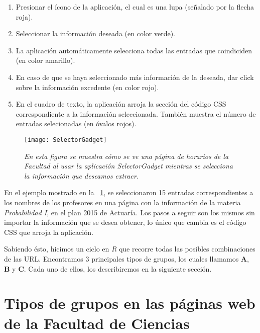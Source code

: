 \begin{enumerate}
\item Presionar el ícono de la aplicación, el cual es una lupa (señalado por la flecha roja).

\item Seleccionar la información deseada (en color verde).

\item La aplicación automáticamente selecciona todas las entradas que coindiciden (en color amarillo).

\item En caso de que se haya seleccionado más información de la deseada, dar click sobre la información excedente (en color rojo).

\item  En el cuadro de texto, la aplicación arroja la sección del código CSS correspondiente a la información seleccionada. También muestra el número de entradas selecionadas (en óvalos rojos).
\end{enumerate}


\begin{figure}[H]
\centering
\texttt{[image: SelectorGadget]} %
\caption[\textit{Uso de la aplicación SelectorGadget}]{\textit{En esta figura se muestra cómo se ve una página de horarios de la Facultad al usar la aplicación SelectorGadget mientras se selecciona la información que deseamos extraer.}}\label{appSelectorGadget}
\end{figure}

En el ejemplo mostrado en la \figurename{~\ref{appSelectorGadget}}, se seleccionaron 15 entradas correspondientes a los nombres de los profesores en una página con la información de la materia \textit{Probabilidad I}, en el plan 2015 de Actuaría. Los pasos a seguir son los mismos sin importar la información que se desea obtener, lo único que cambia es el código CSS que arroja la aplicación.

Sabiendo ésto, hicimos un ciclo en \textit{R} que recorre todas las posibles combinaciones de las URL. Encontramos 3 principales tipos de grupos, los cuales llamamos \textbf{A}, \textbf{B} y \textbf{C}. Cada uno de ellos, los describiremos en la siguiente sección.
  
  
  \section{Tipos de grupos en las páginas web de la Facultad de Ciencias} \label{TiposDeGpos}
  
